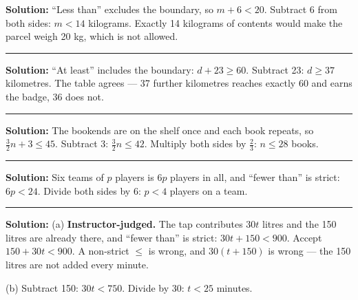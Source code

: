 \documentclass[12pt]{article}
\begin{document}
\textbf{Solution:} ``Less than'' excludes the boundary, so
$m + 6 < 20$. Subtract 6 from both sides: $m < 14$ kilograms. Exactly 14
kilograms of contents would make the parcel weigh 20 kg, which is not
allowed. 

\vspace{0.25cm}\noindent\rule{\linewidth}{0.2pt}\vspace{0.25cm}


\textbf{Solution:} ``At least'' includes the boundary:
$d + 23 \ge 60$. Subtract 23: $d \ge 37$ kilometres. The table agrees --- 37
further kilometres reaches exactly 60 and earns the badge, 36 does not. 

\vspace{0.25cm}\noindent\rule{\linewidth}{0.2pt}\vspace{0.25cm}


\textbf{Solution:} The bookends are on the shelf once and each book repeats, so
$\frac{3}{2}n + 3 \le 45$. Subtract 3: $\frac{3}{2}n \le 42$. Multiply both
sides by $\frac{2}{3}$: $n \le 28$ books. 

\vspace{0.25cm}\noindent\rule{\linewidth}{0.2pt}\vspace{0.25cm}


\textbf{Solution:} Six teams of $p$ players is $6p$ players in all, and
``fewer than'' is strict: $6p < 24$. Divide both sides by 6:
$p < 4$ players on a team. 

\vspace{0.25cm}\noindent\rule{\linewidth}{0.2pt}\vspace{0.25cm}


\textbf{Solution:} (a) \textbf{Instructor-judged.} The tap contributes $30t$
litres and the 150 litres are already there, and ``fewer than'' is strict:
$30t + 150 < 900$. Accept $150 + 30t < 900$. A non-strict $\le$ is wrong, and
$30(t + 150)$ is wrong --- the 150 litres are not added every minute.

(b) Subtract 150: $30t < 750$. Divide by 30:
$t < 25$ minutes. 
\end{document}
